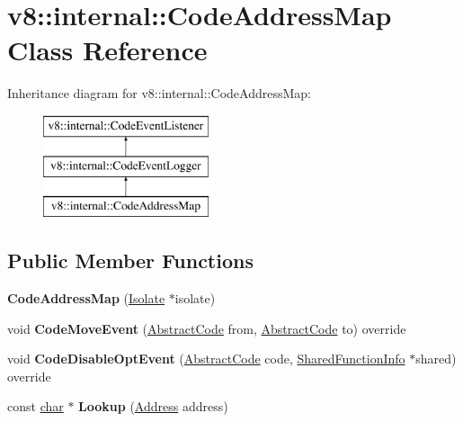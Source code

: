 \hypertarget{classv8_1_1internal_1_1CodeAddressMap}{}\section{v8\+:\+:internal\+:\+:Code\+Address\+Map Class Reference}
\label{classv8_1_1internal_1_1CodeAddressMap}
Inheritance diagram for v8\+:\+:internal\+:\+:Code\+Address\+Map\+:\begin{figure}[H]
\begin{center}
\leavevmode
\includegraphics[height=3.000000cm]{classv8_1_1internal_1_1CodeAddressMap}
\end{center}
\end{figure}
\subsection*{Public Member Functions}
\begin{DoxyCompactItemize}
\item 
\mbox{\label{classv8_1_1internal_1_1CodeAddressMap_ae6049c6139e77f95124fbf0d03b1738b}} 
{\bfseries Code\+Address\+Map} (\mbox{\hyperlink{classv8_1_1internal_1_1Isolate}{Isolate}} $\ast$isolate)
\item 
\mbox{\label{classv8_1_1internal_1_1CodeAddressMap_a3bfe7b8726ed003a526514cf81fc2ea8}} 
void {\bfseries Code\+Move\+Event} (\mbox{\hyperlink{classv8_1_1internal_1_1AbstractCode}{Abstract\+Code}} from, \mbox{\hyperlink{classv8_1_1internal_1_1AbstractCode}{Abstract\+Code}} to) override
\item 
\mbox{\label{classv8_1_1internal_1_1CodeAddressMap_a60509ff8f37a142e874ccdbb08f001a3}} 
void {\bfseries Code\+Disable\+Opt\+Event} (\mbox{\hyperlink{classv8_1_1internal_1_1AbstractCode}{Abstract\+Code}} code, \mbox{\hyperlink{classv8_1_1internal_1_1SharedFunctionInfo}{Shared\+Function\+Info}} $\ast$shared) override
\item 
\mbox{\label{classv8_1_1internal_1_1CodeAddressMap_a7390ba26a90e3c63b006d79b874d59a4}} 
const \mbox{\hyperlink{classchar}{char}} $\ast$ {\bfseries Lookup} (\mbox{\hyperlink{classuintptr__t}{Address}} address)
\end{DoxyCompactItemize}
